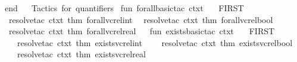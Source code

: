 \begin{isabellebody}
\ end\isanewline
{\isacartoucheclose}\isanewline
\isanewline
{}\isamarkupfalse%
\ {\isacartoucheopen}\isanewline
{\isacharparenleft}{\kern0pt}{\isacharasterisk}{\kern0pt}{\isacharasterisk}{\kern0pt}\ Tactics\ for\ quantifiers\ {\isacharasterisk}{\kern0pt}{\isacharasterisk}{\kern0pt}{\isacharparenright}{\kern0pt}\isanewline
\isanewline
fun\ forall{\isacharunderscore}{\kern0pt}basic{\isacharunderscore}{\kern0pt}tac\ ctxt\ {\isacharequal}{\kern0pt}\isanewline
\ \ FIRST{\isacharprime}{\kern0pt}{\isacharbrackleft}{\kern0pt}\isanewline
\ \ resolve{\isacharunderscore}{\kern0pt}tac\ ctxt\ {\isacharbrackleft}{\kern0pt}{\isacharat}{\kern0pt}{\isacharbraceleft}{\kern0pt}thm\ forall{\isacharunderscore}{\kern0pt}vc{\isacharunderscore}{\kern0pt}rel{\isacharunderscore}{\kern0pt}int{\isacharbraceright}{\kern0pt}{\isacharbrackright}{\kern0pt}{\isacharcomma}{\kern0pt}\isanewline
\ \ resolve{\isacharunderscore}{\kern0pt}tac\ ctxt\ {\isacharbrackleft}{\kern0pt}{\isacharat}{\kern0pt}{\isacharbraceleft}{\kern0pt}thm\ forall{\isacharunderscore}{\kern0pt}vc{\isacharunderscore}{\kern0pt}rel{\isacharunderscore}{\kern0pt}bool{\isacharbraceright}{\kern0pt}{\isacharbrackright}{\kern0pt}{\isacharcomma}{\kern0pt}\isanewline
\ \ resolve{\isacharunderscore}{\kern0pt}tac\ ctxt\ {\isacharbrackleft}{\kern0pt}{\isacharat}{\kern0pt}{\isacharbraceleft}{\kern0pt}thm\ forall{\isacharunderscore}{\kern0pt}vc{\isacharunderscore}{\kern0pt}rel{\isacharunderscore}{\kern0pt}real{\isacharbraceright}{\kern0pt}{\isacharbrackright}{\kern0pt}\isanewline
\ \ {\isacharbrackright}{\kern0pt}{\isacharsemicolon}{\kern0pt}\isanewline
\isanewline
fun\ exists{\isacharunderscore}{\kern0pt}basic{\isacharunderscore}{\kern0pt}tac\ ctxt\ {\isacharequal}{\kern0pt}\isanewline
\ \ FIRST{\isacharprime}{\kern0pt}{\isacharbrackleft}{\kern0pt}\isanewline
\ \ \ \ resolve{\isacharunderscore}{\kern0pt}tac\ ctxt\ {\isacharbrackleft}{\kern0pt}{\isacharat}{\kern0pt}{\isacharbraceleft}{\kern0pt}thm\ exists{\isacharunderscore}{\kern0pt}vc{\isacharunderscore}{\kern0pt}rel{\isacharunderscore}{\kern0pt}int{\isacharbraceright}{\kern0pt}{\isacharbrackright}{\kern0pt}{\isacharcomma}{\kern0pt}\isanewline
\ \ \ \ resolve{\isacharunderscore}{\kern0pt}tac\ ctxt\ {\isacharbrackleft}{\kern0pt}{\isacharat}{\kern0pt}{\isacharbraceleft}{\kern0pt}thm\ exists{\isacharunderscore}{\kern0pt}vc{\isacharunderscore}{\kern0pt}rel{\isacharunderscore}{\kern0pt}bool{\isacharbraceright}{\kern0pt}{\isacharbrackright}{\kern0pt}{\isacharcomma}{\kern0pt}\isanewline
\ \ \ \ resolve{\isacharunderscore}{\kern0pt}tac\ ctxt\ {\isacharbrackleft}{\kern0pt}{\isacharat}{\kern0pt}{\isacharbraceleft}{\kern0pt}thm\ exists{\isacharunderscore}{\kern0pt}vc{\isacharunderscore}{\kern0pt}rel{\isacharunderscore}{\kern0pt}real{\isacharbraceright}{\kern0pt}{\isacharbrackright}{\kern0pt}\isanewline

\end{isabellebody}
